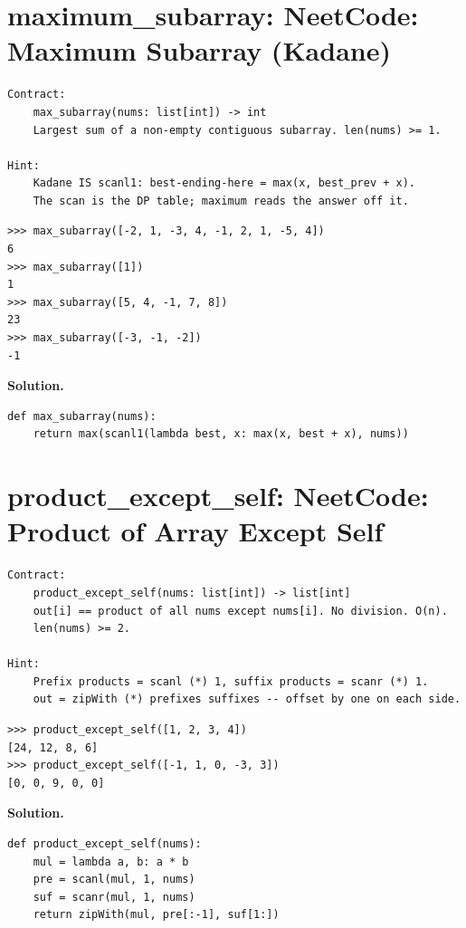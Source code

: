 \documentclass[10pt,letterpaper]{book}
\begin{document}
\section{maximum\_subarray: NeetCode: Maximum Subarray (Kadane)}
\begin{lstlisting}[style=ex]
Contract:
    max_subarray(nums: list[int]) -> int
    Largest sum of a non-empty contiguous subarray. len(nums) >= 1.

Hint:
    Kadane IS scanl1: best-ending-here = max(x, best_prev + x).
    The scan is the DP table; maximum reads the answer off it.
\end{lstlisting}
\begin{lstlisting}[style=ex]
>>> max_subarray([-2, 1, -3, 4, -1, 2, 1, -5, 4])
6
>>> max_subarray([1])
1
>>> max_subarray([5, 4, -1, 7, 8])
23
>>> max_subarray([-3, -1, -2])
-1
\end{lstlisting}
\noindent\textbf{Solution.}
\begin{lstlisting}[style=code]
def max_subarray(nums):
    return max(scanl1(lambda best, x: max(x, best + x), nums))
\end{lstlisting}

\section{product\_except\_self: NeetCode: Product of Array Except Self}
\begin{lstlisting}[style=ex]
Contract:
    product_except_self(nums: list[int]) -> list[int]
    out[i] == product of all nums except nums[i]. No division. O(n).
    len(nums) >= 2.

Hint:
    Prefix products = scanl (*) 1, suffix products = scanr (*) 1.
    out = zipWith (*) prefixes suffixes -- offset by one on each side.
\end{lstlisting}
\begin{lstlisting}[style=ex]
>>> product_except_self([1, 2, 3, 4])
[24, 12, 8, 6]
>>> product_except_self([-1, 1, 0, -3, 3])
[0, 0, 9, 0, 0]
\end{lstlisting}
\noindent\textbf{Solution.}
\begin{lstlisting}[style=code]
def product_except_self(nums):
    mul = lambda a, b: a * b
    pre = scanl(mul, 1, nums)
    suf = scanr(mul, 1, nums)
    return zipWith(mul, pre[:-1], suf[1:])
\end{lstlisting}
\end{document}
